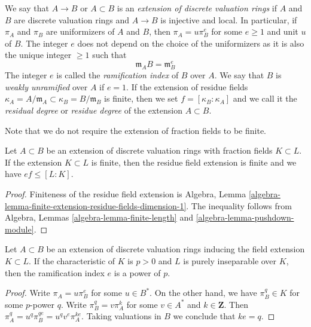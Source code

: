 \begin{definition}
\label{definition-extension-discrete-valuation-rings}
We say that $A \to B$ or $A \subset B$ is an
{\it extension of discrete valuation rings} if $A$ and $B$ are
discrete valuation rings and $A \to B$ is injective and local.
In particular, if $\pi_A$ and $\pi_B$ are uniformizers of
$A$ and $B$, then $\pi_A = u \pi_B^e$ for some $e \geq 1$ and unit
$u$ of $B$. The integer $e$ does not depend on the choice of
the uniformizers as it is also the unique integer $\geq 1$ such that
$$
\mathfrak m_A B = \mathfrak m_B^e
$$
The integer $e$ is called the {\it ramification index} of $B$ over $A$.
We say that $B$ is {\it weakly unramified} over $A$ if $e = 1$.
If the extension of residue fields
$\kappa_A = A/\mathfrak m_A \subset \kappa_B = B/\mathfrak m_B$
is finite, then we set $f = [\kappa_B : \kappa_A]$ and we
call it the {\it residual degree} or {\it residue degree}
of the extension $A \subset B$.
\end{definition}

\noindent
Note that we do not require the extension of fraction fields to be finite.

\begin{lemma}
\label{lemma-inequality}
Let $A \subset B$ be an extension of discrete valuation rings with
fraction fields $K \subset L$. If the extension $K \subset L$
is finite, then the residue field extension is finite and we have
$ef \leq [L : K]$.
\end{lemma}

\begin{proof}
Finiteness of the residue field extension is
Algebra, Lemma \ref{algebra-lemma-finite-extension-residue-fields-dimension-1}.
The inequality follows from
Algebra, Lemmas \ref{algebra-lemma-finite-length} and
\ref{algebra-lemma-pushdown-module}.
\end{proof}

\begin{lemma}
\label{lemma-ramification-index-a-power-of-p}
Let $A \subset B$ be an extension of discrete valuation rings
inducing the field extension $K \subset L$. If the characteristic
of $K$ is $p > 0$ and $L$ is purely inseparable over $K$, then
the ramification index $e$ is a power of $p$.
\end{lemma}

\begin{proof}
Write $\pi_A = u \pi_B^e$ for some $u \in B^*$. On the other hand, we have
$\pi_B^q \in K$ for some $p$-power $q$. Write
$\pi_B^q = v \pi_A^k$ for some $v \in A^*$ and $k \in \mathbf{Z}$.
Then $\pi_A^q = u^q \pi_B^{qe} = u^q v^e \pi_A^{ke}$.
Taking valuations in $B$ we conclude that $ke = q$.
\end{proof}


